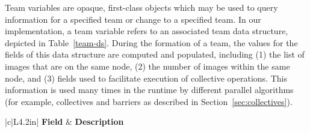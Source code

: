 Team variables are opaque, first-class objects which may be used to query
information for a specified team or change to a specified team. In our
implementation, a team variable refers to an associated team data structure,
depicted in Table~\ref{team-ds}. During the formation of a team, the values
for the fields of this data structure are computed and populated, including
(1) the list of images that are on the same node, (2) the number of images
within the same node, and (3) fields used to facilitate execution of
collective operations.  This information is used many times in the runtime by
different parallel algorithms (for example, collectives and barriers as
described in Section~\ref{sec:collectives}).
\begin{table}[!h]

\caption{Team data structure}
\label{team-ds}

\begin{tabular}{|c|L{4.2in}|}
\hline
\textbf{Field} & \textbf{Description}  \\ 
\hline


\end{tabular}
\end{table}
